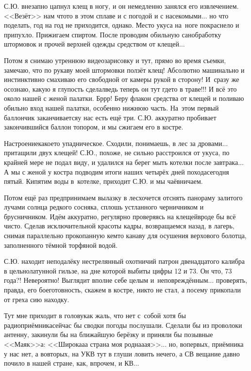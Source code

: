 С.Ю. внезапно цапнул клещ в ногу, и он немедленно занялся его извлечением. <<Везёт>> нам что\sdash то в этом сплаве и с погодой и с насекомыми$\ldots$ но что поделать, год на год не приходится, однако. Место укуса на~ноге покраснело и припухло. Прижигаем спиртом. После проводим обильную санобработку штормовок и прочей верхней одежды средством от клещей$\ldots$
 
Потом я снимаю утреннюю видеозарисовку и тут, прямо во время съемки, замечаю, что по рукаву моей штормовки ползёт клещ! Абсолютно машинально и инстинктивно смахиваю его свободной от камеры рукой в сторону! И~сразу же осознаю, какую я глупость сделал\mdash ведь теперь он тут где\sdash то в траве!!! И всё это около нашей с женой палатки. Бр\sdash р\sdash р! Беру флакон средства от клещей и поливаю обильно вход нашей палатки, особенно нижнюю часть. На~этом первый баллончик заканчивается\mdash у нас есть ещё три. С.Ю. аккуратно пробивает закончившийся баллон топором, и мы сжигаем его в костре. 

Настроение\mdash какое\sdash то упадническое. Сходили, понимаешь, в лес за дровами$\ldots$ притащили двух клещей! С.Ю., похоже, не сильно расстроился от укуса, по крайней мере не подал виду, и удалился на берег мыть котелки после завтрака$\ldots$ А мы с женой у костра подводим итоги наших четырёх дней похода\mdash сегодня пятый. Кипятим воды в~котелке, приходит С.Ю. и мы чаёвничаем.

Потом ещё раз предпринимаем вылазку в лес\mdash хочется отснять панораму залитого лучами солнца редкого сосняка, сплошь устланного черничником и брусничником. Идём аккуратно, регулярно проверяясь на клещей\mdash вроде бы всё чисто. Сделав исключительной красоты кадры, возвращаемся назад, в лагерь, снимая параллельно прокопанную кем\sdash то канаву для осушения верхового болотца, заполненного тёмной торфяной водой.

С.Ю. находит неподалёку нестрелянный охотничий патрон двенадцатого калибра в цельнолатунной гильзе, на дне которой выбиты цифры 12 и 73. Он что, 73 года?! Невероятно! Выглядит вполне себе целым и~неповреждённым$\ldots$ проверять, правда, его боеготовность, скажем в костре, никто не стал, а посему прикопали от греха сию находку. 

Тут мне приходит в голову\mdash как жаль, что нет с~собой хотя бы радиоприёмника\mdash сейчас бы сводки погоды послушали. Сделали бы из проволоки антенну, закинули бы на ближайшую берёзку и приняли бы позывные <<Маяк>>\sdash а: <<Широка\sdash а\sdash а страна моя родна\sdash а\sdash ая>>$\ldots$ но, во\sdash первых, приёмника у нас нет, а во\sdash вторых, на УКВ тут в глуши ловить нечего, а СВ вещание давно почило в нашей стране, как, впрочем, и КВ$\ldots$

